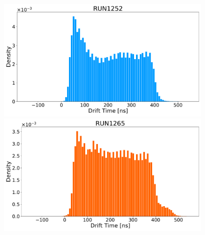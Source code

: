 \documentclass{beamer}
\begin{document}
\begin{frame}
{\begin{columns}
\begin{column}{0.5\textwidth}
					\begin{figure}
						\centering 
						\includegraphics[width=1.0\textwidth]{./Images/reference_blue.pdf}
						\includegraphics[width=1.0\textwidth]	{./Images/1265_orange.pdf}
					\end{figure}

			\end{column}


			\begin{column}{0.5\textwidth}


\end{column}
\end{columns}}
\end{frame}
\end{document}
